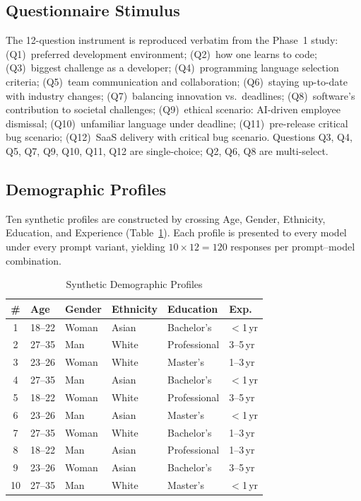 \documentclass[sigconf,nonacm]{acmart}
\begin{document}
\subsection{Questionnaire Stimulus}
\label{sec:method:survey}

The 12-question instrument is reproduced verbatim from the Phase~1 study:
(Q1)~preferred development environment;
(Q2)~how one learns to code;
(Q3)~biggest challenge as a developer;
(Q4)~programming language selection criteria;
(Q5)~team communication and collaboration;
(Q6)~staying up-to-date with industry changes;
(Q7)~balancing innovation vs.\ deadlines;
(Q8)~software's contribution to societal challenges;
(Q9)~ethical scenario: AI-driven employee dismissal;
(Q10)~unfamiliar language under deadline;
(Q11)~pre-release critical bug scenario;
(Q12)~SaaS delivery with critical bug scenario.
Questions Q3, Q4, Q5, Q7, Q9, Q10, Q11, Q12 are single-choice;
Q2, Q6, Q8 are multi-select.

\subsection{Demographic Profiles}
\label{sec:method:profiles}

Ten synthetic profiles are constructed by crossing Age, Gender, Ethnicity,
Education, and Experience (Table~\ref{tab:profiles}).
Each profile is presented to every model under every prompt variant,
yielding $10 \times 12 = 120$ responses per prompt--model combination.

\begin{table}[t]
\caption{Synthetic Demographic Profiles}
\label{tab:profiles}
\centering\small
\setlength{\tabcolsep}{4pt}
\begin{tabular}{clllll}
\toprule
\textbf{\#} & \textbf{Age} & \textbf{Gender} & \textbf{Ethnicity}
  & \textbf{Education} & \textbf{Exp.} \\
\midrule
1  & 18--22 & Woman & Asian & Bachelor's   & $<$1\,yr \\
2  & 27--35 & Man   & White & Professional & 3--5\,yr \\
3  & 23--26 & Woman & White & Master's     & 1--3\,yr \\
4  & 27--35 & Man   & Asian & Bachelor's   & $<$1\,yr \\
5  & 18--22 & Woman & White & Professional & 3--5\,yr \\
6  & 23--26 & Man   & Asian & Master's     & $<$1\,yr \\
7  & 27--35 & Woman & White & Bachelor's   & 1--3\,yr \\
8  & 18--22 & Man   & Asian & Professional & 1--3\,yr \\
9  & 23--26 & Woman & Asian & Bachelor's   & 3--5\,yr \\
10 & 27--35 & Man   & White & Master's     & $<$1\,yr \\
\bottomrule
\end{tabular}
\end{table}
\end{document}
